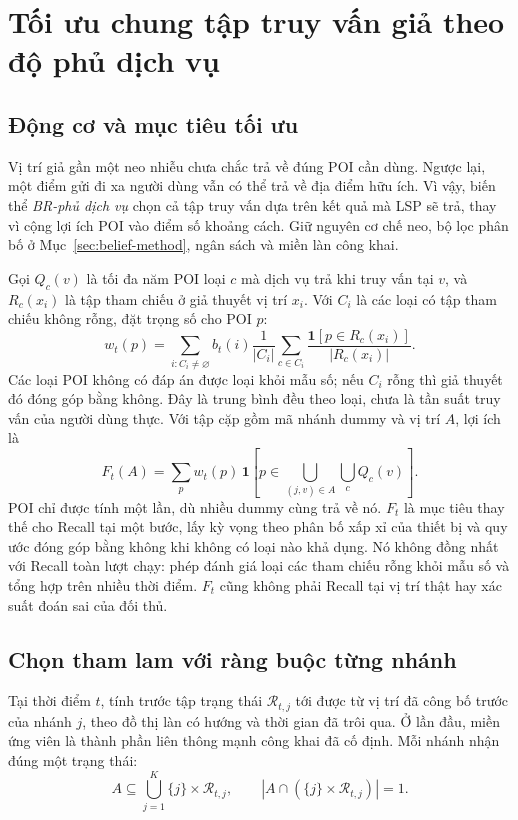 \begingroup
{}
\section{Tối ưu chung tập truy vấn giả theo độ phủ dịch vụ}
\label{sec:service-cover-method}

\subsection{Động cơ và mục tiêu tối ưu}

Vị trí giả gần một neo nhiễu chưa chắc trả về đúng POI cần dùng. Ngược lại, một điểm gửi đi xa người dùng vẫn có thể trả về địa điểm hữu ích. Vì vậy, biến thể \emph{BR-phủ dịch vụ} chọn cả tập truy vấn dựa trên kết quả mà LSP sẽ trả, thay vì cộng lợi ích POI vào điểm số khoảng cách. Giữ nguyên cơ chế neo, bộ lọc phân bố ở Mục~\ref{sec:belief-method}, ngân sách và miền làn công khai.

Gọi $Q_c(v)$ là tối đa năm POI loại $c$ mà dịch vụ trả khi truy vấn tại $v$, và $R_c(x_i)$ là tập tham chiếu ở giả thuyết vị trí $x_i$. Với $C_i$ là các loại có tập tham chiếu không rỗng, đặt trọng số cho POI $p$:
\[
w_t(p)=\sum_{i:C_i\ne\varnothing} b_t(i)\frac{1}{|C_i|}
\sum_{c\in C_i}\frac{\mathbf 1[p\in R_c(x_i)]}{|R_c(x_i)|}.
\]
Các loại POI không có đáp án được loại khỏi mẫu số; nếu $C_i$ rỗng thì giả thuyết đó đóng góp bằng không. Đây là trung bình đều theo loại, chưa là tần suất truy vấn của người dùng thực. Với tập cặp gồm mã nhánh dummy và vị trí $A$, lợi ích là
\[
F_t(A)=\sum_p w_t(p)\,
\mathbf 1\!\left[p\in\bigcup_{(j,v)\in A}\bigcup_c Q_c(v)\right].
\]
POI chỉ được tính một lần, dù nhiều dummy cùng trả về nó. $F_t$ là mục tiêu thay thế cho Recall tại một bước, lấy kỳ vọng theo phân bố xấp xỉ của thiết bị và quy ước đóng góp bằng không khi không có loại nào khả dụng. Nó không đồng nhất với Recall toàn lượt chạy: phép đánh giá loại các tham chiếu rỗng khỏi mẫu số và tổng hợp trên nhiều thời điểm. $F_t$ cũng không phải Recall tại vị trí thật hay xác suất đoán sai của đối thủ.

\subsection{Chọn tham lam với ràng buộc từng nhánh}

Tại thời điểm $t$, tính trước tập trạng thái $\mathcal R_{t,j}$ tới được từ vị trí đã công bố trước của nhánh $j$, theo đồ thị làn có hướng và thời gian đã trôi qua. Ở lần đầu, miền ứng viên là thành phần liên thông mạnh công khai đã cố định. Mỗi nhánh nhận đúng một trạng thái:
\[
A\subseteq\bigcup_{j=1}^{K}\{j\}\times\mathcal R_{t,j},
\qquad |A\cap(\{j\}\times\mathcal R_{t,j})|=1.
\]

